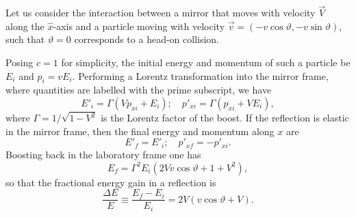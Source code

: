 \documentclass[varenna]{cimento}
\begin{document}
Let us consider the interaction between a mirror that moves with velocity $\vec{V}$ along the $\hat{x}$-axis and a particle moving with velocity $\vec{v}=(-v \cos\vartheta,-v\sin\vartheta)$, such that $\vartheta=0$ corresponds to a head-on collision.

Posing $c=1$ for simplicity, the initial energy and momentum of such a particle be $E_i$ and $p_i=v E_i$.
Performing a Lorentz transformation into the mirror frame, where quantities are labelled with the prime subscript, we have
\begin{equation}
    E'_i=\Gamma (V p_{xi} +E_i); \quad p'_{xi}=\Gamma (p_{xi}+VE_i),
\end{equation}
where $\Gamma=1/\sqrt{1-V^2}$ is the Lorentz factor of the boost.
If the reflection is elastic in the mirror frame, then the final energy and momentum along $x$ are
\begin{equation}
    E'_f=E'_i;\quad p'_{xf}=-p'_{xi}.
\end{equation}
Boosting back in the laboratory frame one has
\begin{equation}\label{energygain}
    E_f= \Gamma^2 E_i (2 V v \cos\vartheta +1 + V^2), 
\end{equation}
so that the fractional energy gain in a reflection is
\begin{equation}\label{eq:de}
    \frac{\Delta E}{E}\equiv\frac{E_f-E_i}{E_i}=2 V (v\cos\vartheta+V).
\end{equation}
\end{document}
